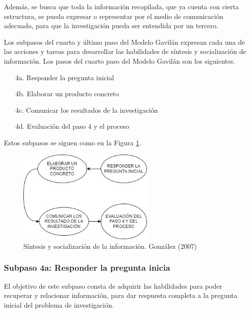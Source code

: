 Además, se busca que toda la información recopilada, que ya cuenta con cierta estructura, se pueda expresar o representar por el medio de comunicación adecuado, para que la investigación pueda ser entendida por un tercero.

Los subpasos del cuarto y último paso del Modelo Gavilán expresan cada una de las acciones y tareas para desarrollar las habilidades de síntesis y socialización de información. Los pasos del cuarto paso del Modelo Gavilán son los siguientes.

\begin{itemize}
  \item [4a.] Responder la pregunta inicial
  \item [4b.] Elaborar un producto concreto
  \item [4c.] Comunicar los resultados de la investigación
  \item [4d.] Evaluación del paso 4 y el proceso
\end{itemize}

Estos subpasos se siguen como en la Figura \ref{fig:26}.

\begin{figure}[H]
  \centering
  \includegraphics[width=0.60\textwidth]{Cap2/Figuras/Síntesis y socialización de información.jpg}
  \caption{Síntesis y socialización de la información. González (2007)}
  \label{fig:26}
\end{figure}


\subsubsection{Subpaso 4a: Responder la pregunta inicia}
\label{secPaso4aCap2}

El objetivo de este subpaso consta de adquirir las habilidades para poder recuperar y relacionar información, para dar respuesta completa a la pregunta inicial del problema de investigación.

